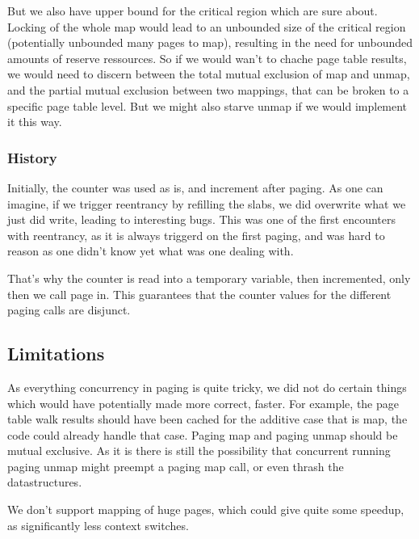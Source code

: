 But we also have upper bound for the critical region which are sure about.
Locking of the whole map would lead to an unbounded size of the
critical region (potentially unbounded many pages to map), resulting in the need
for unbounded amounts of reserve ressources.
So if we would wan't to chache page table results, we would need to discern
between the total mutual exclusion of map and unmap, and the partial mutual
exclusion between two mappings, that can be broken to a specific page table
level.
But we might also starve unmap if we would implement it this way.

\subsubsection{History}

Initially, the counter was used as is, and increment after paging.
As one can imagine, if we trigger reentrancy by refilling the slabs, we did
overwrite what we just did write, leading to interesting bugs.
This was one of the first encounters with reentrancy, as it is always triggerd
on the first paging, and was hard to reason as one didn't know yet what was one
dealing with.

That's why the counter is read into a temporary variable, then incremented, only
then we call page in.
This guarantees that the counter values for the different paging calls are
disjunct.

\subsection{Limitations}

As everything concurrency in paging is quite tricky, we did not do certain
things which would have potentially made more correct, faster.
For example, the page table walk results should have been cached for the
additive case that is map, the code could already handle that case.
Paging map and paging unmap should be mutual exclusive. As it is there is still
the possibility that concurrent running paging unmap might preempt a paging map
call, or even thrash the datastructures.

We don't support mapping of huge pages, which could give quite some speedup, as
significantly less context switches.
